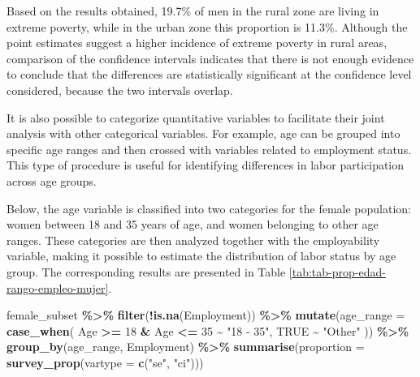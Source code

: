 \documentclass[
  english,
  12pt,
]{book}
\newenvironment{Shaded}{\begin{snugshade}}{\end{snugshade}}
\newcommand{\AttributeTok}[1]{\textcolor[rgb]{0.13,0.29,0.53}{#1}}
\newcommand{\ConstantTok}[1]{\textcolor[rgb]{0.56,0.35,0.01}{#1}}
\newcommand{\DecValTok}[1]{\textcolor[rgb]{0.00,0.00,0.81}{#1}}
\newcommand{\FunctionTok}[1]{\textcolor[rgb]{0.13,0.29,0.53}{\textbf{#1}}}
\newcommand{\NormalTok}[1]{#1}
\newcommand{\SpecialCharTok}[1]{\textcolor[rgb]{0.81,0.36,0.00}{\textbf{#1}}}
\newcommand{\StringTok}[1]{\textcolor[rgb]{0.31,0.60,0.02}{#1}}
\begin{document}
Based on the results obtained, 19.7\% of men in the rural zone are living in extreme poverty, while in the urban zone this proportion is 11.3\%. Although the point estimates suggest a higher incidence of extreme poverty in rural areas, comparison of the confidence intervals indicates that there is not enough evidence to conclude that the differences are statistically significant at the confidence level considered, because the two intervals overlap.

It is also possible to categorize quantitative variables to facilitate their joint analysis with other categorical variables. For example, age can be grouped into specific age ranges and then crossed with variables related to employment status. This type of procedure is useful for identifying differences in labor participation across age groups.

Below, the age variable is classified into two categories for the female population: women between 18 and 35 years of age, and women belonging to other age ranges. These categories are then analyzed together with the employability variable, making it possible to estimate the distribution of labor status by age group. The corresponding results are presented in Table \ref{tab:tab-prop-edad-rango-empleo-mujer}.

\begin{Shaded}
\begin{Highlighting}[]
\NormalTok{female\_subset }\SpecialCharTok{\%\textgreater{}\%}
  \FunctionTok{filter}\NormalTok{(}\SpecialCharTok{!}\FunctionTok{is.na}\NormalTok{(Employment)) }\SpecialCharTok{\%\textgreater{}\%}
  \FunctionTok{mutate}\NormalTok{(}\AttributeTok{age\_range =} \FunctionTok{case\_when}\NormalTok{(}
\NormalTok{    Age }\SpecialCharTok{\textgreater{}=} \DecValTok{18} \SpecialCharTok{\&}\NormalTok{ Age }\SpecialCharTok{\textless{}=} \DecValTok{35} \SpecialCharTok{\textasciitilde{}} \StringTok{"18 {-} 35"}\NormalTok{,}
    \ConstantTok{TRUE} \SpecialCharTok{\textasciitilde{}} \StringTok{"Other"}
\NormalTok{  )) }\SpecialCharTok{\%\textgreater{}\%}
  \FunctionTok{group\_by}\NormalTok{(age\_range, Employment) }\SpecialCharTok{\%\textgreater{}\%}
  \FunctionTok{summarise}\NormalTok{(}\AttributeTok{proportion =} \FunctionTok{survey\_prop}\NormalTok{(}\AttributeTok{vartype =} \FunctionTok{c}\NormalTok{(}\StringTok{"se"}\NormalTok{, }\StringTok{"ci"}\NormalTok{)))}
\end{Highlighting}
\end{Shaded}
\end{document}
